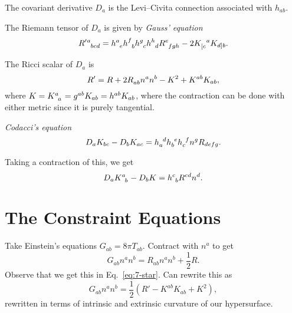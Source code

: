 \begin{lemma}
  The covariant derivative $D_a$ is the Levi--Civita connection associated with $h_{ab}$.
\end{lemma}
\begin{claim}
  The Riemann tensor of $D_a$ is given by \emph{Gauss' equation}
  \begin{equation}
    R'{} \indices{^{a}_{bcd}} = h\indices{^{a}_{e}} h\indices{^{f}_{b}} h\indices{^{g}_{c}} h\indices{^{h}_{d}} R\indices{^{e}_{fgh}} -2 K\indices{_{[c}^{a}} K_{d] b}.
  \end{equation}
\end{claim}
\begin{lemma}
  The Ricci scalar of $D_a$ is
  \begin{equation}
    \label{eq:7-star}
    R' = R + 2 R\indices{_{ab}} n^{a} n^{b} - K^2 + K^{ab} K_{ab},
  \end{equation}
  where $K = K\indices{^{a}_{a}} = g^{ab} K_{ab} = h^{ab} K_{ab}$, where the contraction can be done with either metric since it is purely tangential.
\end{lemma}
\begin{claim}
  \emph{Codacci's equation}
  \begin{equation}
    D_a K_{bc} - D_{b} K_{ac} = h\indices{_{a}^{d}} h\indices{_{b}^{e}} h\indices{_{c}^{f}} n^{g} R_{defg}.
  \end{equation}
\end{claim}
\begin{lemma}
  Taking a contraction of this, we get
  \begin{equation}
    \label{eq:7-dag}
    D_a K\indices{^{a}_{b}} - D_{b} K = h\indices{^{c}_{b}} R^{cd} n^{d}.
  \end{equation}
\end{lemma}

\section{The Constraint Equations}%
\label{sec:the_constraint_equations}

Take Einstein's equations $G_{ab} = 8 \pi T_{ab}$. Contract with $n^{a}$ to get
\begin{equation}
  G_{ab} n^{a} n^{b} = R_{ab} n^{a} n^{b} + \frac{1}{2} R.
\end{equation}
Observe that we get this in Eq.~\eqref{eq:7-star}. Can rewrite this as 
\begin{equation}
  G_{ab} n^{a} n^{b} = \frac{1}{2} (R' -K^{ab} K_{ab} + K^2),
\end{equation}
rewritten in terms of intrinsic and extrinsic curvature of our hypersurface.

